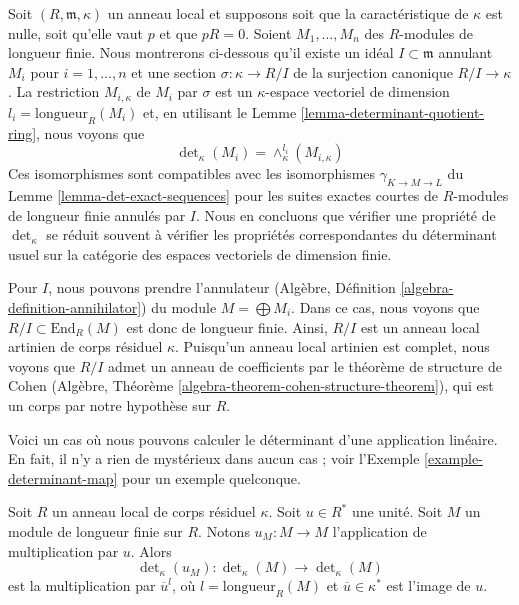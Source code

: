 \begin{remark}
\label{remark-explain-determinant}
Soit $(R, \mathfrak m, \kappa)$ un anneau local et supposons soit que
la caractéristique de $\kappa$ est nulle, soit qu'elle vaut $p$ et que $p R = 0$.
Soient $M_1, \ldots, M_n$ des $R$-modules de longueur finie.
Nous montrerons ci-dessous qu'il existe un
idéal $I \subset \mathfrak m$ annulant $M_i$ pour $i = 1, \ldots, n$
et une section $\sigma : \kappa \to R/I$ de la surjection canonique
$R/I \to \kappa$. La restriction $M_{i, \kappa}$ de $M_i$ par $\sigma$
est un $\kappa$-espace vectoriel de dimension $l_i = \text{longueur}_R(M_i)$ et,
en utilisant le Lemme \ref{lemma-determinant-quotient-ring}, nous voyons que
$$
\det\nolimits_\kappa(M_i) = \wedge_\kappa^{l_i}(M_{i, \kappa})
$$
Ces isomorphismes sont compatibles avec les isomorphismes
$\gamma_{K \to M \to L}$ du Lemme \ref{lemma-det-exact-sequences}
pour les suites exactes courtes de $R$-modules de longueur finie annulés
par $I$. Nous en concluons que vérifier une propriété de
$\det_\kappa$ se réduit souvent à vérifier les propriétés correspondantes
du déterminant usuel sur la catégorie des espaces vectoriels de dimension
finie.

\medskip\noindent
Pour $I$, nous pouvons prendre l'annulateur
(Algèbre, Définition \ref{algebra-definition-annihilator})
du module $M = \bigoplus M_i$. Dans ce cas, nous voyons que
$R/I \subset \text{End}_R(M)$ est donc de longueur finie.
Ainsi, $R/I$ est un anneau local artinien de corps résiduel $\kappa$.
Puisqu'un anneau local artinien est complet, nous voyons que $R/I$
admet un anneau de coefficients par le théorème de structure de Cohen
(Algèbre, Théorème \ref{algebra-theorem-cohen-structure-theorem}),
qui est un corps par notre hypothèse sur $R$.
\end{remark}

\noindent
Voici un cas où nous pouvons calculer le déterminant d'une application linéaire.
En fait, il n'y a rien de mystérieux dans aucun cas ; voir
l'Exemple \ref{example-determinant-map} pour un exemple quelconque.

\begin{lemma}
\label{lemma-times-u-determinant}
Soit $R$ un anneau local de corps résiduel $\kappa$.
Soit $u \in R^*$ une unité.
Soit $M$ un module de longueur finie sur $R$.
Notons $u_M : M \to M$ l'application de multiplication par $u$.
Alors
$$
\det\nolimits_\kappa(u_M) :
\det\nolimits_\kappa(M)
\longrightarrow
\det\nolimits_\kappa(M)
$$
est la multiplication par $\overline{u}^l$, où $l = \text{longueur}_R(M)$
et $\overline{u} \in \kappa^*$ est l'image de $u$.
\end{lemma}

